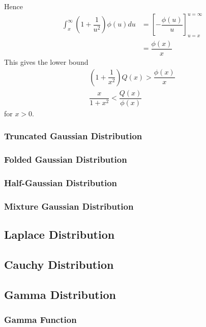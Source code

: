 \documentclass[11pt]{report} %
\begin{document}
Hence
\begin{align}
\int_{x}^{\infty}\left(1 + \dfrac{1}{u^{2}}\right)\phi\left(u\right)du &= \left[-\dfrac{\phi\left(u\right)}{u}\right]_{u = x}^{u = \infty} \\
&= \dfrac{\phi\left(x\right)}{x}
\end{align}
This gives the lower bound
\begin{gather}
\left(1 + \dfrac{1}{x^{2}}\right)Q\left(x\right) > \dfrac{\phi\left(x\right)}{x} \\
\dfrac{x}{1 + x^{2}} < \dfrac{Q\left(x\right)}{\phi\left(x\right)}
\end{gather}
for $x > 0$.

\subsubsection{Truncated Gaussian Distribution}

\subsubsection{Folded Gaussian Distribution}

\subsubsection{Half-Gaussian Distribution}

\subsubsection{Mixture Gaussian Distribution}

\subsection{Laplace Distribution}

\subsection{Cauchy Distribution}

\subsection{Gamma Distribution}

\subsubsection{Gamma Function}
\end{document}
